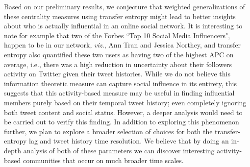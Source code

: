 \documentclass[10pt,letterpaper]{article}
\begin{document}
Based on our preliminary results, we conjecture that weighted generalizations of these centrality measures using transfer entropy might lead to better insights about who is actually influential in an online social network. 
It is interesting to note for example that two of the Forbes ``Top 10 Social Media Influencers", happen to be in our network, \emph{viz.}, Ann Tran and Jessica Northey, and transfer entropy also quantified these two users as having two of the highest APC on average, i.e., there was a high reduction in uncertainty about their followers activity on Twitter given their tweet histories. While we do not believe this information theoretic measure can capture social influence in its entirety, 
this suggests that this activity-based measure may be useful in finding influential members purely based on their temporal tweet history; even completely ignoring both tweet content and social status. However, a deeper analysis would need to be carried out to verify this finding.
In addition to exploring this phenomenon further, we plan to explore a broader selection of choices for both the transfer-entropy lag and tweet history time resolution. We believe that by doing an in-depth analysis of both of these parameters we can discover interesting activity-based communities that occur on much broader time scales.










\end{document}
